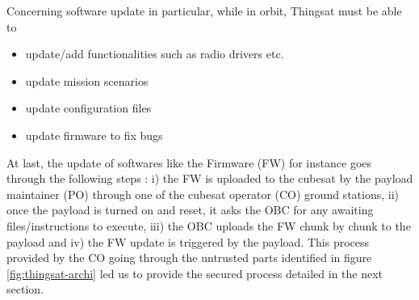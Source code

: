 


Concerning software update in particular, while in orbit, Thingsat must be able to
\begin{itemize}
    \item update/add functionalities such as radio drivers  etc.
    \item update mission scenarios
    \item update configuration files
    \item update firmware to fix bugs
\end{itemize} 

At last, the update of softwares like the Firmware (FW) for instance goes
through the following steps : i) the FW is uploaded to the cubesat by the
payload maintainer (PO) through one of the cubesat operator (CO) ground
stations, ii) once the payload is turned on and reset, it asks the OBC for any
awaiting files/instructions to execute, iii) the OBC uploads the FW chunk by
chunk to the payload and iv) the FW update is triggered by the payload. This
process provided by the CO going through the untrusted parts identified in
figure \ref{fig:thingsat-archi} led us to provide the secured process detailed in the
next section.
